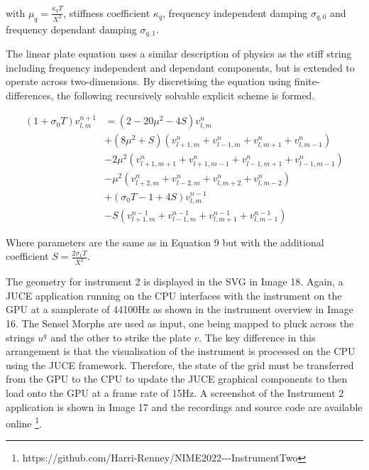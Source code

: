 \documentclass[sigconf]{nimeart}
\begin{document}
with $\mu_q = \frac{\kappa_q T}{X^2}$, stiffness coefficient $\kappa_q$, frequency independent damping $\sigma_{q,0}$ and frequency dependant damping $\sigma_{q,1}$.

The linear plate equation \cite{Morse1986Theoretical} uses a similar description of physics as the stiff string including frequency independent and dependant components, but is extended to operate across two-dimensions. By discretising the equation using finite-differences, the following recursively solvable explicit scheme is formed.


\begin{equation}\begin{aligned}
    (1 + \sigma_0 T) v^{n+1}_{l,m} &= (2-20\mu^2-4 S)  v^{n}_{l,m}\\
    & + (8\mu^2 + S)(v^{n}_{l+1,m} + v^{n}_{l-1,m} + v^{n}_{l,m+1} + v^{n}_{l,m-1})\\
                                    & - 2 \mu^2 (v^{n}_{l+1,m+1} + v^{n}_{l+1,m-1} + v^{n}_{l-1,m+1} + v^{n}_{l-1,m-1})\\
                                    & - \mu^2 (v^{n}_{l+2,m} + v^{n}_{l-2,m} + v^{n}_{l,m+2} + v^{n}_{l,m-2})\\
                                    & + (\sigma_0 T - 1 + 4S) v^{n-1}_{l,m}\\
                                    & - S (v^{n-1}_{l+1,m} + v^{n-1}_{l-1,m} + v^{n-1}_{l,m+1} + v^{n-1}_{l,m-1})
    \end{aligned}\end{equation}


Where parameters are the same as in Equation 9 but with the additional coefficient $S = \frac{2 \sigma_1 T}{X^2}$.

The geometry for instrument 2 is displayed in the SVG in Image 18. Again, a JUCE application running on the CPU interfaces with the instrument on the GPU at a samplerate of 44100Hz as shown in the instrument overview in Image 16. The Sensel Morphs are used as input, one being mapped to pluck across the strings $u^q$ and the other to strike the plate $v$. The key difference in this arrangement is that the visualisation of the instrument is processed on the CPU using the JUCE framework. Therefore, the state of the grid must be transferred from the GPU to the CPU to update the JUCE graphical components to then load onto the GPU at a frame rate of 15Hz. A screenshot of the Instrument 2 application is shown in Image 17 and the recordings and source code are available online \footnote{https://github.com/Harri-Renney/NIME2022-\/-\/-InstrumentTwo}.
\end{document}
